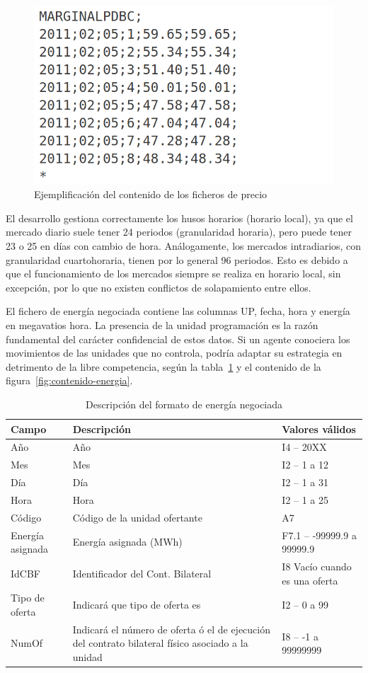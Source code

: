 \begin{figure}
\centering
\includegraphics[width=0.5\linewidth]{figures/contenido-precio.png}
\caption{Ejemplificación del contenido de los ficheros de precio}
\label{fig:contenido-precio}
\end{figure}

El desarrollo gestiona correctamente los husos horarios (horario local), ya que el mercado diario suele tener 24 periodos (granularidad horaria), pero puede tener 23 o 25 en días con cambio de hora. Análogamente, los mercados intradiarios, con granularidad cuartohoraria, tienen por lo general 96 periodos. Esto es debido a que el funcionamiento de los mercados siempre se realiza en horario local, sin excepción, por lo que no existen conflictos de solapamiento entre ellos.

El fichero de energía negociada contiene las columnas UP, fecha, hora y energía en megavatios hora. La presencia de la unidad programación es la razón fundamental del carácter confidencial de estos datos. Si un agente conociera los movimientos de las unidades que no controla, podría adaptar su estrategia en detrimento de la libre competencia, según la tabla~\ref{tab:descripción-energia} y el contenido de la figura~\ref{fig:contenido-energia}.

\begin{table}[ht]
\centering
\begin{tabular}{|l|p{5cm}|l|}
\hline
Campo & Descripción & Valores válidos \\
\hline
Año & Año & I4 -- 20XX \\
Mes & Mes & I2 -- 1 a 12 \\
Día & Día & I2 -- 1 a 31 \\
Hora & Hora & I2 -- 1 a 25 \\
Código & Código de la unidad ofertante & A7 \\
Energía asignada & Energía asignada (MWh) & F7.1 – -99999.9 a 99999.9 \\
IdCBF & Identificador del Cont. Bilateral & I8 Vacío cuando es una oferta \\
Tipo de oferta & Indicará que tipo de oferta es & I2 – 0 a 99 \\
NumOf & Indicará el número de oferta ó el de ejecución del contrato bilateral físico asociado a la unidad & I8 – -1 a 99999999 \\
\hline
\end{tabular}
\caption{Descripción del formato de energía negociada}
\label{tab:descripción-energia}
\end{table}

